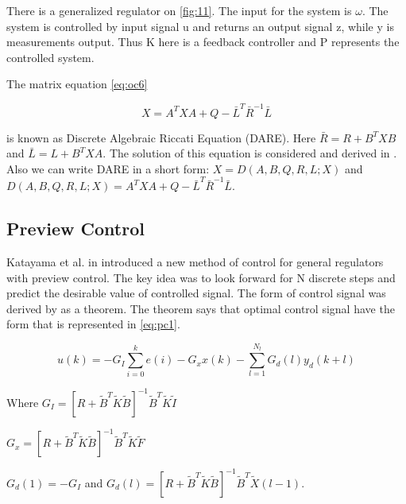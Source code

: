 \documentclass[12pt,a4paper]{report}
\begin{document}
			There is a generalized regulator on \cref{fig:11}. The input for the system is $\omega$. The system is controlled by input signal u and returns an output signal z, while y is measurements output. Thus K here is a feedback controller and P represents the controlled system.
			
			The matrix equation \ref{eq:oc6}
			
			\begin{equation}\label{eq:oc6}
				X = A^{T}XA + Q - \bar{L}^{T} \bar{R}^{-1} \bar{L}
			\end{equation}
			
			is known as Discrete Algebraic Riccati Equation (DARE). Here $\bar{R} = R + B^{T}XB$ and $\bar{L} = L + B^{T}XA$. The solution of this equation is considered and derived in \cite{hazell2008discrete}. Also we can write DARE in a short form: $X = D(A,B,Q,R,L;X)$ and $D(A,B,Q,R,L;X) = A^{T} XA + Q -  \bar{L}^{T} \bar{R}^{-1} \bar{L}$.
		
		\subsection{Preview Control} 
			Katayama et al. in \cite{katayama1985design} introduced a new method of control for general regulators with preview control. The key idea was to look forward for N discrete steps and predict the desirable value of controlled signal. The form of control signal was derived by \cite{katayama1985design} as a theorem. The theorem says that optimal control signal have the form that is represented in \ref{eq:pc1}.
			
			\begin{equation}\label{eq:pc1}
				u(k) = -G_I \sum^{k}_{i=0} e(i) - G_xx(k) - \sum^{N_l}_{l=1}G_d(l)y_d(k+l)
			\end{equation}
			
			\begin{description}
				\item
				Where $G_I = [R+\tilde{B}^T \tilde{K} \tilde{B}]^{-1} \tilde{B}^T \tilde{K} \tilde{I}$
				\item
				$G_x = [R+\tilde{B}^T \tilde{K} \tilde{B}]^{-1} \tilde{B}^T \tilde{K} \tilde{F}$
				\item
				$G_d(1) = -G_I$ and $G_d(l) = [R+\tilde{B}^T \tilde{K} \tilde{B}]^{-1} \tilde{B}^T \tilde{X}(l-1)$.
			\end{description}
			
\end{document}

